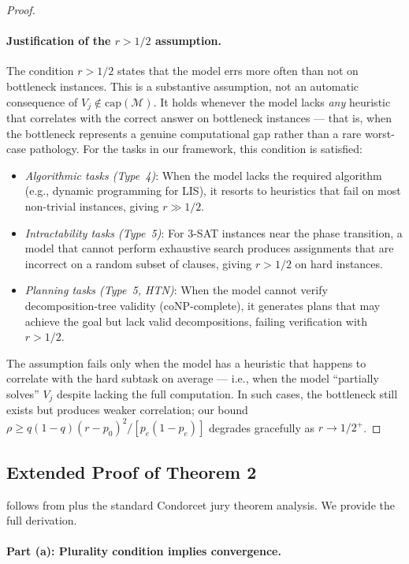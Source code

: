 \documentclass{article}
\theoremstyle{definition}
\theoremstyle{remark}
\newcommand{\coNP}{\mathrm{coNP}}
\newcommand{\calM}{\mathcal{M}}         %
\begin{document}
\begin{proof}
\paragraph{Justification of the $r > 1/2$ assumption.}
The condition $r > 1/2$ states that the model errs more often than not on bottleneck instances.
This is a substantive assumption, not an automatic consequence of $V_j \notin \mathrm{cap}(\calM)$.
It holds whenever the model lacks \emph{any} heuristic that correlates with the correct answer on bottleneck instances --- that is, when the bottleneck represents a genuine computational gap rather than a rare worst-case pathology.
For the tasks in our framework, this condition is satisfied:
\begin{itemize}
    \item \emph{Algorithmic tasks (Type~4)}: When the model lacks the required algorithm (e.g., dynamic programming for LIS), it resorts to heuristics that fail on most non-trivial instances, giving $r \gg 1/2$.
    \item \emph{Intractability tasks (Type~5)}: For 3-SAT instances near the phase transition, a model that cannot perform exhaustive search produces assignments that are incorrect on a random subset of clauses, giving $r > 1/2$ on hard instances.
    \item \emph{Planning tasks (Type~5, HTN)}: When the model cannot verify decomposition-tree validity ($\coNP$-complete), it generates plans that may achieve the goal but lack valid decompositions, failing verification with $r > 1/2$.
\end{itemize}
The assumption fails only when the model has a heuristic that happens to correlate with the hard subtask on average --- i.e., when the model ``partially solves'' $V_j$ despite lacking the full computation.
In such cases, the bottleneck still exists but produces weaker correlation; our bound $\rho \geq q(1-q)(r-p_0)^2/[p_e(1-p_e)]$ degrades gracefully as $r \to 1/2^+$.
\end{proof}

\subsection{Extended Proof of Theorem 2}

 follows from  plus the standard Condorcet jury theorem analysis. We provide the full derivation.

\paragraph{Part (a): Plurality condition implies convergence.}
\end{document}
